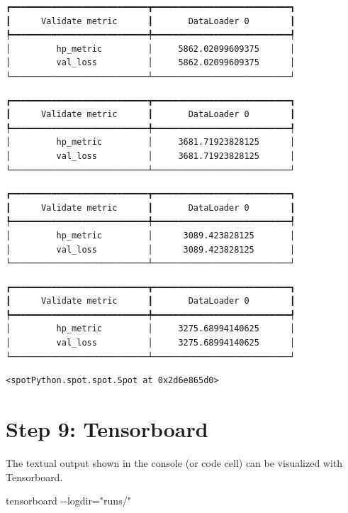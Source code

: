 \documentclass[
  letterpaper,
  DIV=11,
  numbers=noendperiod]{scrreprt}
\newenvironment{Shaded}{\begin{snugshade}}{\end{snugshade}}
\newcommand{\NormalTok}[1]{\textcolor[rgb]{0.00,0.23,0.31}{#1}}
\begin{document}
\begin{verbatim}
┏━━━━━━━━━━━━━━━━━━━━━━━━━━━┳━━━━━━━━━━━━━━━━━━━━━━━━━━━┓
┃      Validate metric      ┃       DataLoader 0        ┃
┡━━━━━━━━━━━━━━━━━━━━━━━━━━━╇━━━━━━━━━━━━━━━━━━━━━━━━━━━┩
│         hp_metric         │     5862.02099609375      │
│         val_loss          │     5862.02099609375      │
└───────────────────────────┴───────────────────────────┘
\end{verbatim}

\begin{verbatim}
┏━━━━━━━━━━━━━━━━━━━━━━━━━━━┳━━━━━━━━━━━━━━━━━━━━━━━━━━━┓
┃      Validate metric      ┃       DataLoader 0        ┃
┡━━━━━━━━━━━━━━━━━━━━━━━━━━━╇━━━━━━━━━━━━━━━━━━━━━━━━━━━┩
│         hp_metric         │     3681.71923828125      │
│         val_loss          │     3681.71923828125      │
└───────────────────────────┴───────────────────────────┘
\end{verbatim}

\begin{verbatim}
┏━━━━━━━━━━━━━━━━━━━━━━━━━━━┳━━━━━━━━━━━━━━━━━━━━━━━━━━━┓
┃      Validate metric      ┃       DataLoader 0        ┃
┡━━━━━━━━━━━━━━━━━━━━━━━━━━━╇━━━━━━━━━━━━━━━━━━━━━━━━━━━┩
│         hp_metric         │      3089.423828125       │
│         val_loss          │      3089.423828125       │
└───────────────────────────┴───────────────────────────┘
\end{verbatim}

\begin{verbatim}
┏━━━━━━━━━━━━━━━━━━━━━━━━━━━┳━━━━━━━━━━━━━━━━━━━━━━━━━━━┓
┃      Validate metric      ┃       DataLoader 0        ┃
┡━━━━━━━━━━━━━━━━━━━━━━━━━━━╇━━━━━━━━━━━━━━━━━━━━━━━━━━━┩
│         hp_metric         │     3275.68994140625      │
│         val_loss          │     3275.68994140625      │
└───────────────────────────┴───────────────────────────┘
\end{verbatim}

\begin{verbatim}
<spotPython.spot.spot.Spot at 0x2d6e865d0>
\end{verbatim}

\section{Step 9: Tensorboard}\label{sec-tensorboard-32}

The textual output shown in the console (or code cell) can be visualized
with Tensorboard.

\begin{Shaded}
\begin{Highlighting}[]
\NormalTok{tensorboard {-}{-}logdir="runs/"}
\end{Highlighting}
\end{Shaded}
\end{document}
